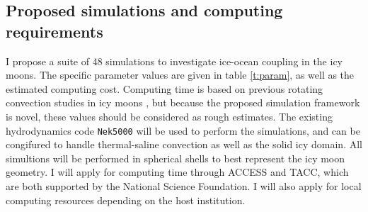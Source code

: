 \documentclass[12pt]{article}
\def\lb{\left(}
\def\rb{\right)}
\begin{document}
\subsection{Proposed simulations and computing requirements}
I propose a suite of 48 simulations to investigate ice-ocean coupling in the icy moons. The specific parameter values are given in table \ref{t:param}, as well as the estimated computing cost. Computing time is based on previous rotating convection studies in icy moons \citep{dL23}, but because the proposed simulation framework is novel, these values should be considered as rough estimates. The existing hydrodynamics code \texttt{Nek5000}\citep{nek5000} will be used to perform the simulations, and can be congifured to handle thermal-saline convection as well as the solid icy domain.
All simultions will be performed in spherical shells to best represent the icy moon geometry.
 I will apply for computing time through ACCESS and TACC, which are both supported by the National Science Foundation. I will also apply for local computing resources depending on the host institution.
\end{document}
